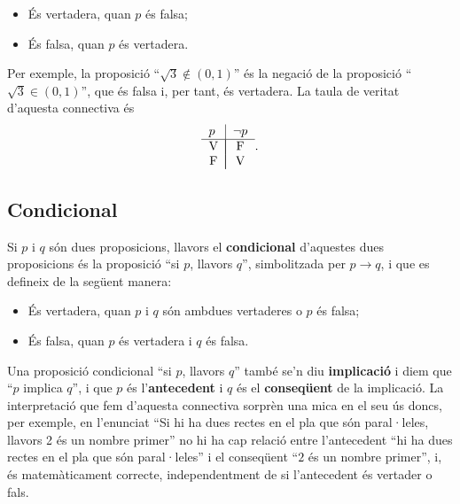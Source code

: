 \begin{itemize}
\item És vertadera, quan $p$ és falsa;

\item És falsa, quan $p$ és vertadera.
\end{itemize}

Per exemple, la proposició \enquote{$\sqrt{3}\notin\left( 0,1\right) $} és
la negació de la proposició \enquote{$\sqrt{3}\in\left( 0,1\right) $}, que
és falsa i, per tant, és vertadera. La taula de veritat d'aquesta
connectiva és\begin{equation*}
\begin{tabular}{l|l}
$p$ & $\lnot p$ \\ \hline
\multicolumn{1}{c|}{V} & \multicolumn{1}{|c}{F} \\
\multicolumn{1}{c|}{F} & \multicolumn{1}{|c}{V}\end{tabular}
\text{.}
\end{equation*}

\subsection{Condicional}

Si $p$ i $q$ són dues proposicions, llavors el \textbf{condicional}
d'aquestes dues proposicions és la proposició \enquote{si $p$, llavors $q$},
simbolitzada per $p\longrightarrow q$, i que es defineix de la següent
manera:

\begin{itemize}
\item És vertadera, quan $p$ i $q$ són ambdues vertaderes o $p$ és falsa;

\item És falsa, quan $p$ és vertadera i $q$ és falsa.
\end{itemize}

Una proposició condicional \enquote{si $p$, llavors $q$} també se'n diu
\textbf{implicació} i diem que \enquote{$p$ implica $q$}, i que $p$ és l'\textbf{antecedent} i $q$ és el \textbf{conseqüent} de la implicació. La interpretació que fem d'aquesta connectiva sorprèn una
mica en el seu ús doncs, per exemple, en l'enunciat \enquote{Si hi ha dues
rectes en el pla que són paral·leles, llavors 2 és un nombre primer} no hi ha cap relació entre l'antecedent \enquote{hi ha dues
rectes en el pla que són paral·leles} i el conseqüent \enquote{$2$ és un nombre primer}, i, és matemàticament correcte,
independentment de si l'antecedent és vertader o fals.

